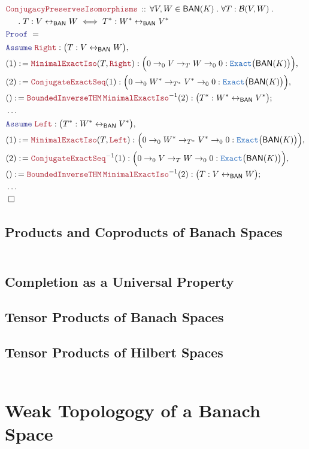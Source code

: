 \documentclass[12pt]{scrartcl}
\newcommand{\TYPE}[1]{\textcolor{NavyBlue}{\mathtt{#1}}}
\newcommand{\LOGIC}[1]{\textcolor{Blue}{\mathtt{#1}}}
\newcommand{\THM}[1]{\textcolor{Maroon}{\mathtt{#1}}}
\renewcommand{\.}{\; . \;}
\newcommand{\de}{: \kern 0.1pc =}
\newcommand{\Theorem}[2]{& \THM{#1} \, :: \, #2 \\ & \Proof = \\ }
\newcommand{\NewLine}{\\ & \kern 1pc}
\newcommand{\Page}[1]{\begin{align*} #1 \end{align*} \newpage   }
\newcommand{\ToBij}{\leftrightarrow}
\newcommand{\Say}[3]{& #1 \de #2 : #3, \\}
\newcommand{\Conclude}[3]{& #1 \de #2 : #3; \\}
\newcommand{\A}{\LOGIC{Assume} \;}
\newcommand{\Assume}[2]{& \A #1 : #2, \\}
\newcommand{\QED}{\; \square}
\newcommand{\EndProof}{& \QED \\}
\newcommand{\Proof}{\LOGIC{Proof} \; }
\newcommand{\BAN}{\textsf{BAN}}
\newcommand{\B}{\mathcal{B}}
\begin{document}
\Page{
\Theorem{ConjugacyPreservesIsomorphisms}{ \forall V,W \in \BAN(K) \. 
 \forall T : \B(V,W) \. 
 \NewLine \. 
 T : V \ToBij_{\BAN} W \iff T^* : W^* \ToBij_{\BAN} V^* 
}
\Assume{\THM{Right}}{ \big( T : V \ToBij_{\BAN} W \big) }
\Say{ (1)}{\THM{MinimalExactIso}(T,\THM{Right})}{\Big( 0 \to_0 V \to_T W \to_0 0 : \TYPE{Exact}\big(\BAN(K)\big) \Big)}
\Say{(2)}{\THM{ConjugateExactSeq}(1)}{ \Big( 0 \to_0 W^* \to_{T^*} V^* \to_0 0 : \TYPE{Exact}\big(\BAN(K)\big) \Big)  }
\Conclude{()}{\THM{BoundedInverseTHM} \, \THM{MinimalExactIso}^{-1}(2)}{ \big( T^* :  W^* \ToBij_{\BAN} V^* \big) }
& \ldots \\
\Assume{\THM{Left}}{\big( T^* :  W^* \ToBij_{\BAN} V^* \big) }
\Say{ (1)}{\THM{MinimalExactIso}(T,\THM{Left})}{\Big( 0 \to_0 W^* \to_{T^*} V^* \to_0 0 : \TYPE{Exact}\big(\BAN(K)\big) \Big)}
\Say{(2)}{\THM{ConjugateExactSeq}^{-1}(1)}{  \Big( 0 \to_0 V \to_T W \to_0 0 : \TYPE{Exact}\big(\BAN(K)\big) \Big) }
\Conclude{()}{\THM{BoundedInverseTHM} \, \THM{MinimalExactIso}^{-1}(2)}{ \big( T : V \ToBij_{\BAN} W \big)}
& \ldots \\
\EndProof
}
\subsection{Products and Coproducts of Banach Spaces}
\Page{}
\subsection{Completion as a Universal Property}
\subsection{Tensor Products of Banach Spaces }
\subsection{Tensor Products of Hilbert Spaces}
\Page{}
\section{Weak Topologogy of a Banach Space}
\end{document}
